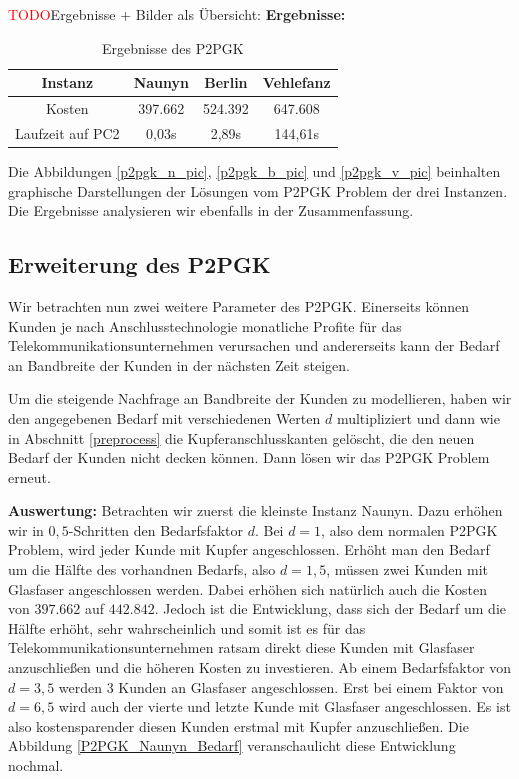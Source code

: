 \documentclass[11pt,a4paper]{article}
\newcommand{\TODO}{\textcolor{red}{TODO}}
\theoremstyle{my_th_style1}
\begin{document}
\TODO Ergebnisse + Bilder als Übersicht:
\textbf{Ergebnisse:} 
\begin{table}[h]
	\centering
	\begin{tabular}{c|c|c|c}
		Instanz & Naunyn & Berlin & Vehlefanz \\	
		\hline
		Kosten & 397.662 & 524.392 & 647.608 \\
		Laufzeit auf PC2 & 0,03s & 2,89s & 144,61s \\
	\end{tabular}
	\label{P2PGK}
	\caption{Ergebnisse des P2PGK} 
\end{table}

Die Abbildungen \eqref{p2pgk_n_pic}, \eqref{p2pgk_b_pic} und \eqref{p2pgk_v_pic} beinhalten graphische Darstellungen der L\"osungen vom P2PGK Problem der drei Instanzen.
Die Ergebnisse analysieren wir ebenfalls in der Zusammenfassung.

\subsection{Erweiterung des P2PGK}
\label{Erweiterung des P2PGK}
Wir betrachten nun zwei weitere Parameter des P2PGK.
Einerseits k\"onnen Kunden je nach Anschlusstechnologie monatliche Profite f\"ur das Telekommunikationsunternehmen verursachen und andererseits kann der Bedarf an Bandbreite der Kunden in der n\"achsten Zeit steigen.

Um die steigende Nachfrage an Bandbreite der Kunden zu modellieren, haben wir den angegebenen Bedarf mit verschiedenen Werten $d$ multipliziert und dann wie in Abschnitt \ref{preprocess} die Kupferanschlusskanten gelöscht, die den neuen Bedarf der Kunden nicht decken können.
Dann lösen wir das P2PGK Problem erneut. 

\textbf{Auswertung:}
Betrachten wir zuerst die kleinste Instanz Naunyn.
Dazu erhöhen wir in $0,5$-Schritten den Bedarfsfaktor $d$. Bei $d=1$, also dem normalen P2PGK Problem, wird jeder Kunde mit Kupfer angeschlossen. Erhöht man den Bedarf um die Hälfte des vorhandnen Bedarfs, also $d=1,5$, müssen zwei Kunden mit Glasfaser angeschlossen werden. Dabei erhöhen sich natürlich auch die Kosten von $397.662$ auf $442.842$.
Jedoch ist die Entwicklung, dass sich der Bedarf um die Hälfte erhöht, sehr wahrscheinlich und somit ist es f\"ur das Telekommunikationsunternehmen ratsam direkt diese Kunden mit Glasfaser anzuschließen und die höheren Kosten zu investieren.
Ab einem Bedarfsfaktor von $d=3,5$ werden 3 Kunden an Glasfaser angeschlossen.
Erst bei einem Faktor von $d=6,5$ wird auch der vierte und letzte Kunde mit Glasfaser angeschlossen. 
Es ist also kostensparender diesen Kunden erstmal mit Kupfer anzuschließen.
Die Abbildung \ref{P2PGK_Naunyn_Bedarf} veranschaulicht diese Entwicklung nochmal.
\end{document}
